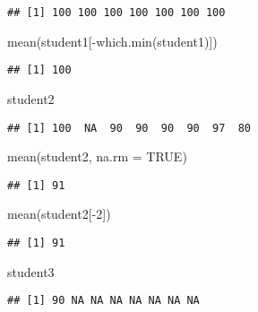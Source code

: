 \documentclass[
]{article}
\newenvironment{Shaded}{\begin{snugshade}}{\end{snugshade}}
\newcommand{\AttributeTok}[1]{\textcolor[rgb]{0.77,0.63,0.00}{#1}}
\newcommand{\ConstantTok}[1]{\textcolor[rgb]{0.00,0.00,0.00}{#1}}
\newcommand{\DecValTok}[1]{\textcolor[rgb]{0.00,0.00,0.81}{#1}}
\newcommand{\FunctionTok}[1]{\textcolor[rgb]{0.00,0.00,0.00}{#1}}
\newcommand{\NormalTok}[1]{#1}
\newcommand{\SpecialCharTok}[1]{\textcolor[rgb]{0.00,0.00,0.00}{#1}}
\begin{document}
\begin{verbatim}
## [1] 100 100 100 100 100 100 100
\end{verbatim}

\begin{Shaded}
\begin{Highlighting}[]
\FunctionTok{mean}\NormalTok{(student1[}\SpecialCharTok{{-}}\FunctionTok{which.min}\NormalTok{(student1)])}
\end{Highlighting}
\end{Shaded}

\begin{verbatim}
## [1] 100
\end{verbatim}

\begin{Shaded}
\begin{Highlighting}[]
\NormalTok{student2}
\end{Highlighting}
\end{Shaded}

\begin{verbatim}
## [1] 100  NA  90  90  90  90  97  80
\end{verbatim}

\begin{Shaded}
\begin{Highlighting}[]
\FunctionTok{mean}\NormalTok{(student2, }\AttributeTok{na.rm =} \ConstantTok{TRUE}\NormalTok{)}
\end{Highlighting}
\end{Shaded}

\begin{verbatim}
## [1] 91
\end{verbatim}

\begin{Shaded}
\begin{Highlighting}[]
\FunctionTok{mean}\NormalTok{(student2[}\SpecialCharTok{{-}}\DecValTok{2}\NormalTok{])}
\end{Highlighting}
\end{Shaded}

\begin{verbatim}
## [1] 91
\end{verbatim}

\begin{Shaded}
\begin{Highlighting}[]
\NormalTok{student3}
\end{Highlighting}
\end{Shaded}

\begin{verbatim}
## [1] 90 NA NA NA NA NA NA NA
\end{verbatim}
\end{document}
